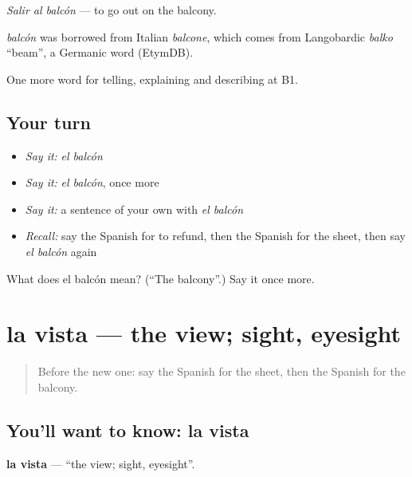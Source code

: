 \emph{Salir al balcón} — to go out on the balcony.

\begin{cousinweb}
\emph{balcón} was borrowed from Italian \emph{balcone}, which comes from Langobardic \emph{balko} \textquotedblleft{}beam\textquotedblright{}, a Germanic word (EtymDB).
\end{cousinweb}

\begin{grammarlens}[title={What you've built}]
One more word for telling, explaining and describing at B1.
\end{grammarlens}

\subsection*{Your turn}
\begin{itemize}
\raggedright
  \item \emph{Say it:} \emph{el balcón}
  \item \emph{Say it:} \emph{el balcón}, once more
  \item \emph{Say it:} a sentence of your own with \emph{el balcón}
  \item \emph{Recall:} say the Spanish for to refund, then the Spanish for the sheet, then say \emph{el balcón} again
\end{itemize}

\begin{tcolorbox}[breakable,colback=teal!4,colframe=teal!35!black,title={Before you move on}]
What does el balcón mean? (\textquotedblleft{}The balcony\textquotedblright{}.) Say it once more.
\end{tcolorbox}
\section[la vista]{la vista — the view; sight, eyesight}

\label{lesson:ES-C664-vista}



\begin{quote}
Before the new one: say the Spanish for the sheet, then the Spanish for the balcony.
\end{quote}

\subsection*{You'll want to know: la vista}
\textbf{la vista} — \textquotedblleft{}the view; sight, eyesight\textquotedblright{}.


